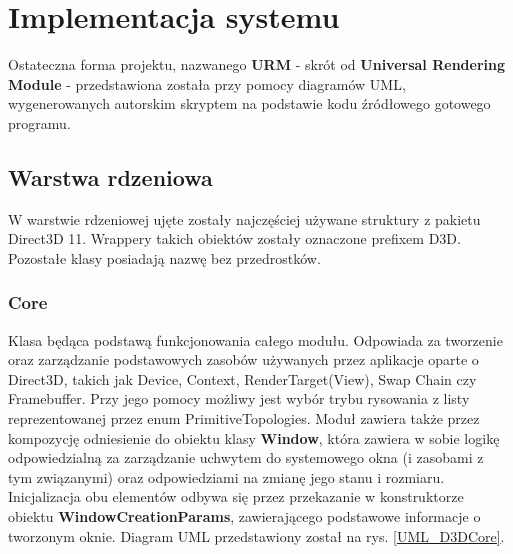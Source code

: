 \chapter{Implementacja systemu}
	Ostateczna forma projektu, nazwanego \textbf{URM} - skrót od \textbf{Universal Rendering Module} - przedstawiona została przy pomocy diagramów UML, wygenerowanych autorskim skryptem na podstawie kodu źródłowego gotowego programu.

\section{Warstwa rdzeniowa}
	W warstwie rdzeniowej ujęte zostały najczęściej używane struktury z pakietu Direct3D 11. Wrappery takich obiektów zostały oznaczone prefixem D3D. Pozostałe klasy posiadają nazwę bez przedrostków.

\subsection{Core}
	Klasa będąca podstawą funkcjonowania całego modułu. 
	Odpowiada za tworzenie oraz zarządzanie podstawowych zasobów używanych przez aplikacje oparte o Direct3D, takich jak Device, Context, RenderTarget(View), Swap Chain czy Framebuffer. Przy jego pomocy możliwy jest wybór trybu rysowania z listy reprezentowanej przez enum PrimitiveTopologies.
	Moduł zawiera także przez kompozycję odniesienie do obiektu klasy \textbf{Window}, która zawiera w sobie logikę odpowiedzialną za zarządzanie uchwytem do systemowego okna (i zasobami z tym związanymi) oraz odpowiedziami na zmianę jego stanu i rozmiaru.
	Inicjalizacja obu elementów odbywa się przez przekazanie w konstruktorze obiektu \textbf{WindowCreationParams}, zawierającego podstawowe informacje o tworzonym oknie.
	Diagram UML przedstawiony został na rys. \ref{UML_D3DCore}.
	
